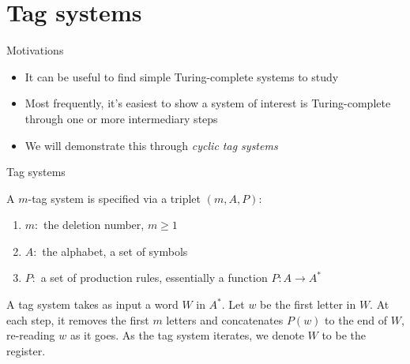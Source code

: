 \documentclass[aspectratio=169]{beamer}
\begin{document}
%     

\section{Tag systems}
\frame{\sectionpage}

\begin{frame}{Motivations}
    \begin{itemize}
        \item It can be useful to find simple Turing-complete systems to study \pause
        \item Most frequently, it's easiest to show a system of interest is Turing-complete through one or more intermediary steps \pause
        \item We will demonstrate this through \textit{cyclic tag systems}
    \end{itemize}
\end{frame}

\begin{frame}{Tag systems}
\begin{defn}
    A \textcolor{sigma@mainblue}{$m$-tag system} is specified via a triplet $(m, A, P):$
    \begin{enumerate}
        \item $m:$ the deletion number, $m \geq 1$
        \item $A:$ the alphabet, a set of symbols
        \item $P:$ a set of production rules, essentially a function $P: A \rightarrow A^*$
    \end{enumerate}
    \pause
    \vspace{8pt}
    A tag system takes as input a word $W$ in $A^*$. Let $w$ be the first letter in $W$. At each step, it removes the first $m$ letters and concatenates $P(w)$ to the end of $W$, re-reading $w$ as it goes.
    \vspace{4pt}
    As the tag system iterates, we denote $W$ to be the \textcolor{sigma@mainblue}{register.}
\end{defn}
\end{frame}
\end{document}
